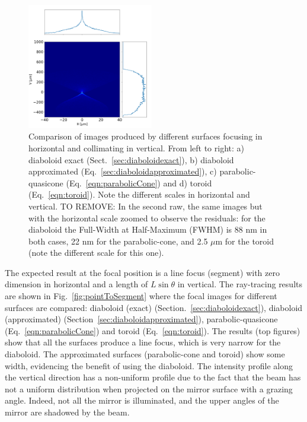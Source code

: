 \documentclass{iucr}              %
\newcommand{\inred}[1]{{\color{red}#1}}
\begin{document}
\begin{figure}
\includegraphics[width=0.49\textwidth]{figures/p2s_toroid_z.png}
\caption{Comparison of images produced by different surfaces focusing in horizontal and collimating in vertical. From left to right: a) diaboloid exact (Sect.~\ref{sec:diaboloidexact}), b) diaboloid approximated (Eq.~\ref{sec:diaboloidapproximated}), c) parabolic-quasicone (Eq.~\ref{eqn:parabolicCone}) and d) toroid (Eq.~\ref{eqn:toroid}). \inred{Note the different scales in horizontal and vertical. TO REMOVE:  In the second raw, the same images but with the horizontal scale zoomed to observe the residuals: for the diaboloid the Full-Width at Half-Maximum (FWHM) is 88 nm in both cases, 22 nm for the parabolic-cone, and 2.5 $\mu$m for the toroid (note the different scale for this one).}
}
\end{figure}

The expected result at the focal position is a line focus (segment) with zero dimension in horizontal and a length of $L\sin\theta$ in vertical. The ray-tracing results are shown in Fig.~\ref{fig:pointToSegment} where the focal images for different surfaces are compared: diaboloid (exact) (Section.~\ref{sec:diaboloidexact}), diaboloid (approximated) (Section~\ref{sec:diaboloidapproximated}), parabolic-quasicone (Eq.~\ref{eqn:parabolicCone}) and toroid (Eq.~\ref{eqn:toroid}). The results (top figures) show that all the surfaces produce a line focus, which is very narrow for the diaboloid. The approximated surfaces (parabolic-cone and toroid) show some width, evidencing the benefit of using the diaboloid. The intensity profile along the vertical direction has a non-uniform profile due to the fact that the beam has not a uniform distribution when projected on the mirror surface with a grazing angle. Indeed, not all the mirror is illuminated, and the upper angles of the mirror are shadowed by the beam. 
\end{document}

